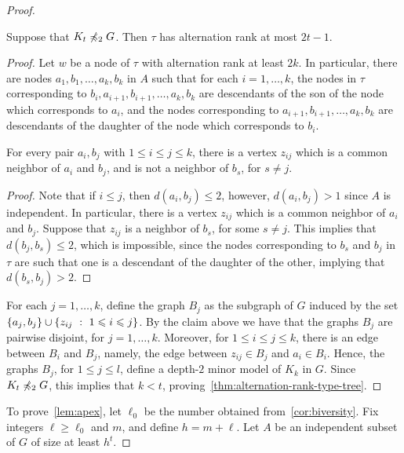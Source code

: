 \begin{proof}
\begin{lemma}\label{thm:alternation-rank-type-tree}
Suppose that  $K_t\not\preccurlyeq_{2} G$.
Then $\tau$ has alternation rank at most $2t-1$.
\end{lemma}
\begin{proof}
	Let $w$ be a node of $\tau$ with alternation rank at least $2k$.  
	In particular, there are nodes $a_1,b_1,\ldots,a_k,b_k$ in $A$
	such that for each $i=1,\ldots,k$, 
	the nodes in $\tau$ corresponding to $b_i,a_{i+1},b_{i+1},\ldots,a_k,b_k$ are  descendants of the son of the node which corresponds to $a_i$,
	and the nodes corresponding to $a_{i+1},b_{i+1},\ldots,a_k,b_k$
	are descendants of the daughter of the node which corresponds to $b_i$.
	
	\begin{claim}
		For every pair $a_i,b_j$ with $1\le i\le j\le k$, there is a vertex $z_{ij}$
		which is a common neighbor of $a_i$ and $b_j$,
		and is not a neighbor of $b_s$, for $s\neq j$.
	\end{claim}
	\begin{proof}
		Note that if $i\le j$, then $d(a_i,b_j)\le 2$, however, $d(a_i,b_j)>1$ since $A$
		is independent. In particular, there is a vertex $z_{ij}$ which is a common neighbor of $a_i$ and $b_j$. 
		Suppose that $z_{ij}$ is a neighbor of $b_s$, for some $s\neq j$. This implies that $d(b_j,b_s)\le 2$, which is impossible, 
since
		 the nodes corresponding to $b_s$ and $b_j$ in $\tau$ are such that one is a descendant of the daughter of the other, implying that $d(b_s,b_j)>2$.
	\end{proof}
  


For each $j=1,\ldots,k$, define the graph $B_j$
as the subgraph of $G$ induced by the set
$\{a_j,b_j\}\cup\{z_{ij}~:~ 1\leqslant i\leqslant  j\}$.
By the claim above we have that the graphs $B_j$
are pairwise disjoint, for $j=1,\ldots,k$.
Moreover, for $1\le i\le j\le k$, there is an edge between $B_i$
and $B_j$, namely, the edge between $z_{ij}\in B_j$
and $a_i\in B_i$.
Hence, the graphs $B_j$, for $1\le j\le l$, define a depth-$2$ minor model of $K_k$ in $G$. Since $K_t\not\preccurlyeq_{2}G$, this implies that $k<t$, proving~\cref{thm:alternation-rank-type-tree}.
\end{proof}

To prove~\cref{lem:apex}, let $\ell_0$
be the number obtained from~\cref{cor:biversity}.
Fix integers $\ell\ge \ell_0$ and $m$, and define $h=m+\ell$.
Let $A$ be an independent subset of $G$
of size at least $h^{t}$.


\end{proof}

